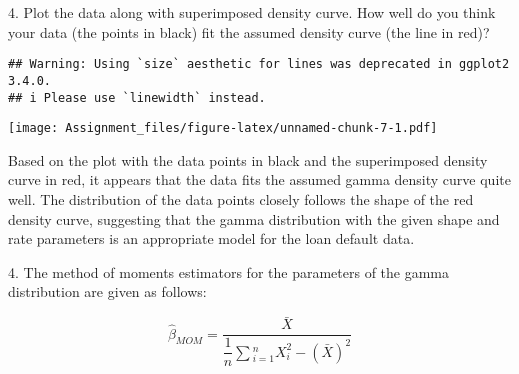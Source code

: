 \documentclass[
]{article}
\newenvironment{Shaded}{\begin{snugshade}}{\end{snugshade}}
\newcommand{\AttributeTok}[1]{\textcolor[rgb]{0.13,0.29,0.53}{#1}}
\newcommand{\ConstantTok}[1]{\textcolor[rgb]{0.56,0.35,0.01}{#1}}
\newcommand{\DecValTok}[1]{\textcolor[rgb]{0.00,0.00,0.81}{#1}}
\newcommand{\FloatTok}[1]{\textcolor[rgb]{0.00,0.00,0.81}{#1}}
\newcommand{\FunctionTok}[1]{\textcolor[rgb]{0.13,0.29,0.53}{\textbf{#1}}}
\newcommand{\NormalTok}[1]{#1}
\newcommand{\OtherTok}[1]{\textcolor[rgb]{0.56,0.35,0.01}{#1}}
\newcommand{\SpecialCharTok}[1]{\textcolor[rgb]{0.81,0.36,0.00}{\textbf{#1}}}
\newcommand{\StringTok}[1]{\textcolor[rgb]{0.31,0.60,0.02}{#1}}
\begin{document}
{ 4. Plot the data along with superimposed density curve. How well do
you think your data (the points in black) fit the assumed density curve
(the line in red)? }

\begin{Shaded}
\end{Shaded}

\begin{verbatim}
## Warning: Using `size` aesthetic for lines was deprecated in ggplot2 3.4.0.
## i Please use `linewidth` instead.
\end{verbatim}

\texttt{[image: Assignment\_files/figure-latex/unnamed-chunk-7-1.pdf]}

Based on the plot with the data points in black and the superimposed
density curve in red, it appears that the data fits the assumed gamma
density curve quite well. The distribution of the data points closely
follows the shape of the red density curve, suggesting that the gamma
distribution with the given shape and rate parameters is an appropriate
model for the loan default data.

4. The method of moments estimators for the parameters of the gamma
distribution are given as follows:

\[\begin{equation}
 \hat{\beta}_{MOM} = \dfrac{\bar{X}}{\dfrac{1}{n}\sum{_{i = 1}^{n}  X_i^2} - (\bar{X})^2}
\end{equation}\]
\end{document}
